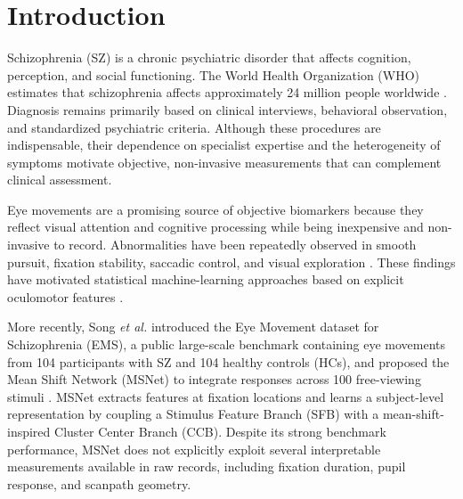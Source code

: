 \documentclass[conference,a4paper]{IEEEtran}
\begin{document}
\section{Introduction}
Schizophrenia (SZ) is a chronic psychiatric disorder that affects cognition, perception, and social functioning. The World Health Organization (WHO) estimates that schizophrenia affects approximately 24 million people worldwide \cite{who2022schizophrenia}. Diagnosis remains primarily based on clinical interviews, behavioral observation, and standardized psychiatric criteria. Although these procedures are indispensable, their dependence on specialist expertise and the heterogeneity of symptoms motivate objective, non-invasive measurements that can complement clinical assessment.

Eye movements are a promising source of objective biomarkers because they reflect visual attention and cognitive processing while being inexpensive and non-invasive to record. Abnormalities have been repeatedly observed in smooth pursuit, fixation stability, saccadic control, and visual exploration \cite{morita2020characteristics,wolf2021review,patel2020social}. These findings have motivated statistical machine-learning approaches based on explicit oculomotor features \cite{benson2012simple,morita2017integrated,huang2020effective,kacur2020analysis}.

More recently, Song \emph{et al.} introduced the Eye Movement dataset for Schizophrenia (EMS), a public large-scale benchmark containing eye movements from 104 participants with SZ and 104 healthy controls (HCs), and proposed the Mean Shift Network (MSNet) to integrate responses across 100 free-viewing stimuli \cite{song2024ems}. MSNet extracts features at fixation locations and learns a subject-level representation by coupling a Stimulus Feature Branch (SFB) with a mean-shift-inspired Cluster Center Branch (CCB). Despite its strong benchmark performance, MSNet does not explicitly exploit several interpretable measurements available in raw records, including fixation duration, pupil response, and scanpath geometry.
\end{document}
